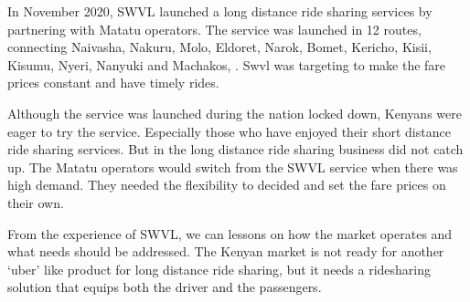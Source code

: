 In November 2020, SWVL launched a long distance ride sharing services by partnering with Matatu operators. The service was launched  in 12 routes, connecting Naivasha, Nakuru, Molo, Eldoret, Narok, Bomet, Kericho, Kisii, Kisumu, Nyeri, Nanyuki and Machakos, \citep{alvin2020}. Swvl was targeting to make the fare prices constant and have timely rides.

Although the service was launched during the nation locked down, Kenyans were eager to try the service. Especially those who have enjoyed their short distance ride sharing services. But in the long distance ride sharing business did not catch up. The Matatu operators would switch from the SWVL service when there was high demand. They needed the flexibility to decided and set the fare prices on their own.

From the experience of SWVL, we can lessons on how the market operates and what needs should be addressed. The Kenyan market is not ready for another `uber' like product for long distance ride sharing, but it needs a ridesharing solution that equips both the driver and the passengers.